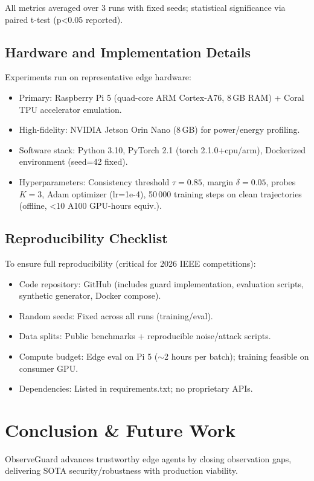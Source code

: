 All metrics averaged over 3 runs with fixed seeds; statistical significance via paired t-test (p<0.05 reported).

\subsection{Hardware and Implementation Details}
Experiments run on representative edge hardware:

\begin{itemize}
    \item Primary: Raspberry Pi 5 (quad-core ARM Cortex-A76, 8\,GB RAM) + Coral TPU accelerator emulation.
    \item High-fidelity: NVIDIA Jetson Orin Nano (8\,GB) for power/energy profiling.
    \item Software stack: Python 3.10, PyTorch 2.1 (torch 2.1.0+cpu/arm), Dockerized environment (seed=42 fixed).
    \item Hyperparameters: Consistency threshold $\tau=0.85$, margin $\delta=0.05$, probes $K=3$, Adam optimizer (lr=1e-4), 50\,000 training steps on clean trajectories (offline, <10 A100 GPU-hours equiv.).
\end{itemize}

\subsection{Reproducibility Checklist}
To ensure full reproducibility (critical for 2026 IEEE competitions):

\begin{itemize}
    \item Code repository: GitHub (includes guard implementation, evaluation scripts, synthetic generator, Docker compose).
    \item Random seeds: Fixed across all runs (training/eval).
    \item Data splits: Public benchmarks + reproducible noise/attack scripts.
    \item Compute budget: Edge eval on Pi 5 ($\sim$2 hours per batch); training feasible on consumer GPU.
    \item Dependencies: Listed in requirements.txt; no proprietary APIs.
\end{itemize}

\section{Conclusion \& Future Work}
ObserveGuard advances trustworthy edge agents by closing observation gaps, delivering SOTA security/robustness with production viability.

